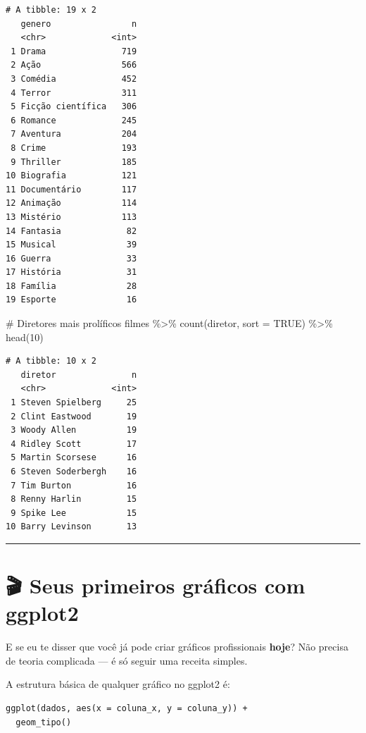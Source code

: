 \documentclass[
  letterpaper,
]{scrbook}
\newenvironment{Shaded}{\begin{snugshade}}{\end{snugshade}}
\newcommand{\AttributeTok}[1]{\textcolor[rgb]{0.40,0.45,0.13}{#1}}
\newcommand{\CommentTok}[1]{\textcolor[rgb]{0.37,0.37,0.37}{#1}}
\newcommand{\ConstantTok}[1]{\textcolor[rgb]{0.56,0.35,0.01}{#1}}
\newcommand{\DecValTok}[1]{\textcolor[rgb]{0.68,0.00,0.00}{#1}}
\newcommand{\FunctionTok}[1]{\textcolor[rgb]{0.28,0.35,0.67}{#1}}
\newcommand{\NormalTok}[1]{\textcolor[rgb]{0.00,0.23,0.31}{#1}}
\newcommand{\SpecialCharTok}[1]{\textcolor[rgb]{0.37,0.37,0.37}{#1}}
\begin{document}
\begin{verbatim}
# A tibble: 19 x 2
   genero                n
   <chr>             <int>
 1 Drama               719
 2 Ação                566
 3 Comédia             452
 4 Terror              311
 5 Ficção científica   306
 6 Romance             245
 7 Aventura            204
 8 Crime               193
 9 Thriller            185
10 Biografia           121
11 Documentário        117
12 Animação            114
13 Mistério            113
14 Fantasia             82
15 Musical              39
16 Guerra               33
17 História             31
18 Família              28
19 Esporte              16
\end{verbatim}

\begin{Shaded}
\begin{Highlighting}[]
\CommentTok{\# Diretores mais prolíficos}
\NormalTok{filmes }\SpecialCharTok{\%\textgreater{}\%} 
  \FunctionTok{count}\NormalTok{(diretor, }\AttributeTok{sort =} \ConstantTok{TRUE}\NormalTok{) }\SpecialCharTok{\%\textgreater{}\%} 
  \FunctionTok{head}\NormalTok{(}\DecValTok{10}\NormalTok{)}
\end{Highlighting}
\end{Shaded}

\begin{verbatim}
# A tibble: 10 x 2
   diretor               n
   <chr>             <int>
 1 Steven Spielberg     25
 2 Clint Eastwood       19
 3 Woody Allen          19
 4 Ridley Scott         17
 5 Martin Scorsese      16
 6 Steven Soderbergh    16
 7 Tim Burton           16
 8 Renny Harlin         15
 9 Spike Lee            15
10 Barry Levinson       13
\end{verbatim}

\begin{center}\rule{0.5\linewidth}{0.5pt}\end{center}

\section{🎬 Seus primeiros gráficos com
ggplot2}\label{seus-primeiros-gruxe1ficos-com-ggplot2}

E se eu te disser que você já pode criar gráficos profissionais
\textbf{hoje}? Não precisa de teoria complicada --- é só seguir uma
receita simples.

A estrutura básica de qualquer gráfico no ggplot2 é:

\begin{verbatim}
ggplot(dados, aes(x = coluna_x, y = coluna_y)) +
  geom_tipo()
\end{verbatim}
\end{document}
